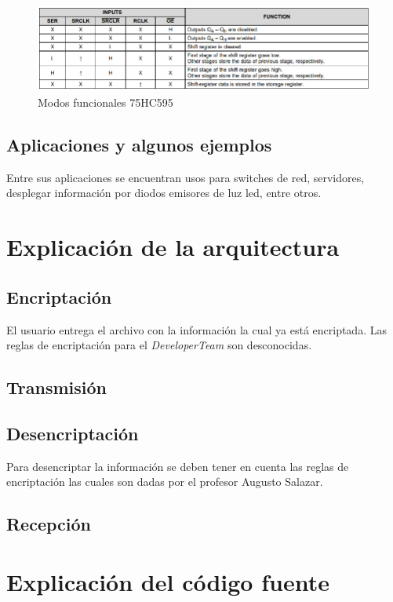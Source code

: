 \documentclass{article}
\begin{document}
    \begin{figure}[h]
    \includegraphics[width=12cm]{imagen/Modos.png}
    \centering
    \caption{Modos funcionales 75HC595}
    \label{fig:Modos}
    \end{figure}
    
\subsection{Aplicaciones y algunos ejemplos}
Entre sus aplicaciones se encuentran usos para switches de red, servidores, desplegar información por diodos emisores de luz led, entre otros.


\section{Explicación de la arquitectura} 
\subsection{Encriptación}
El usuario entrega el archivo con la información la cual ya está encriptada. Las reglas de encriptación para el \textit{DeveloperTeam} son desconocidas.

\subsection{Transmisión}

\subsection{Desencriptación}
Para desencriptar la información se deben tener en cuenta las reglas de encriptación las cuales son dadas por el profesor Augusto Salazar.

\subsection{Recepción}


\section{Explicación del código fuente} 
 
\end{document}

